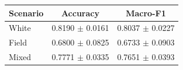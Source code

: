 \begin{tabular}{lcc}
\hline
Scenario & Accuracy & Macro-F1 \\
\hline
White & 0.8190 $\pm$ 0.0161 & 0.8037 $\pm$ 0.0227 \\
Field & 0.6800 $\pm$ 0.0825 & 0.6733 $\pm$ 0.0903 \\
Mixed & 0.7771 $\pm$ 0.0335 & 0.7651 $\pm$ 0.0393 \\
\hline
\end{tabular}
